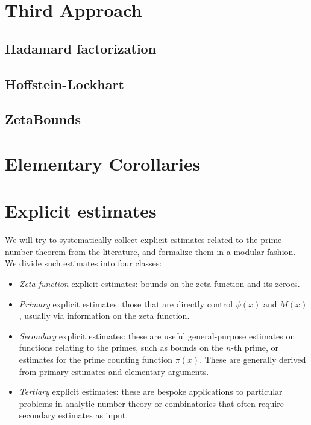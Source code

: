 \chapter{Third Approach}\label{third-approach-chapter}

\section{Hadamard factorization}

\section{Hoffstein-Lockhart}

\section{ZetaBounds}

\chapter{Elementary Corollaries}\label{corollaries-chapter}


\chapter{Explicit estimates}\label{explicit-chapter}

We will try to systematically collect explicit estimates related to the prime number theorem from
the literature, and formalize them in a modular fashion.  We divide such estimates into four
classes:

\begin{itemize}
    \item \emph{Zeta function} explicit estimates: bounds on the zeta function and its zeroes.
    \item \emph{Primary} explicit estimates: those that are directly control $\psi(x)$ and $M(x)$, usually via information on the zeta function.
    \item \emph{Secondary} explicit estimates: these are useful general-purpose estimates on
    functions relating to the primes, such as bounds on the $n$-th prime, or estimates for the prime
    counting function $\pi(x)$.  These are generally derived from primary estimates and elementary arguments.
    \item \emph{Tertiary} explicit estimates: these are bespoke applications to particular problems
    in analytic number theory or combinatorics that often require secondary estimates as input.
\end{itemize}

